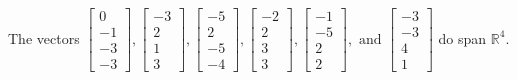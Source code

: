 \begin{exercise}
\begin{exerciseStatement}
  \end{exerciseStatement}
  \begin{exerciseAnswer}
   The vectors \(\left[\begin{array}{r}
0 \\
-1 \\
-3 \\
-3
\end{array}\right] , \left[\begin{array}{r}
-3 \\
2 \\
1 \\
3
\end{array}\right] , \left[\begin{array}{r}
-5 \\
2 \\
-5 \\
-4
\end{array}\right] , \left[\begin{array}{r}
-2 \\
2 \\
3 \\
3
\end{array}\right] , \left[\begin{array}{r}
-1 \\
-5 \\
2 \\
2
\end{array}\right] , \text{ and } \left[\begin{array}{r}
-3 \\
-3 \\
4 \\
1
\end{array}\right]\) 
  	 do  
	span \(\mathbb{R}^4\).
  


  \end{exerciseAnswer}
\end{exercise}